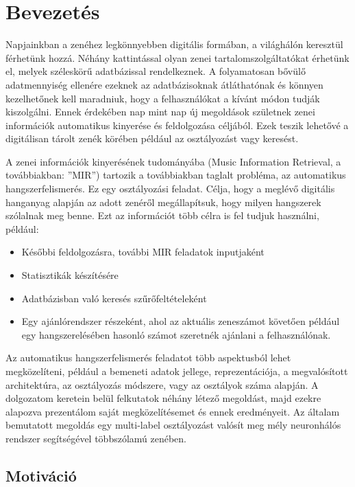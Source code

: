 \chapter{Bevezetés} %
\label{ch:intro}

Napjainkban a zenéhez legkönnyebben digitális formában, a világhálón keresztül férhetünk hozzá. Néhány kattintással olyan zenei tartalomszolgáltatókat érhetünk el, melyek széleskörű adatbázissal rendelkeznek. A folyamatosan bővülő adatmennyiség ellenére ezeknek az adatbázisoknak átláthatónak és könnyen kezelhetőnek kell maradniuk, hogy a felhasználókat a kívánt módon tudják kiszolgálni. Ennek érdekében nap mint nap új  megoldások születnek zenei információk automatikus kinyerése és feldolgozása céljából. Ezek teszik lehetővé a digitálisan tárolt zenék körében például az osztályozást vagy keresést.

A zenei információk kinyerésének tudományába (Music Information Retrieval, a továbbiakban: ''MIR'') tartozik a továbbiakban taglalt probléma, az automatikus hangszerfelismerés. Ez egy osztályozási feladat. Célja, hogy a meglévő digitális hanganyag alapján az adott zenéről megállapítsuk, hogy milyen hangszerek szólalnak meg benne. Ezt az információt több célra is fel tudjuk használni, például:
\begin{itemize}
 \item Későbbi feldolgozásra, további MIR feladatok inputjaként
 \item Statisztikák készítésére
 \item Adatbázisban való keresés szűrőfeltételeként
 \item Egy ajánlórendszer részeként, ahol az aktuális zeneszámot követően például egy hangszerelésében hasonló számot szeretnék ajánlani a felhasználónak.
\end{itemize}

Az automatikus hangszerfelismerés feladatot több aspektusból lehet megközelíteni, például a bemeneti adatok jellege, reprezentációja, a megvalósított architektúra, az osztályozás módszere, vagy az osztályok száma alapján. A dolgozatom keretein belül felkutatok néhány létező megoldást, majd ezekre alapozva prezentálom saját megközelítésemet és ennek eredményeit. Az általam bemutatott megoldás egy multi-label osztályozást valósít meg mély neuronhálós rendszer segítségével többszólamú zenében.

\section{Motiváció}

